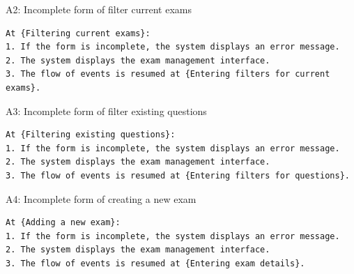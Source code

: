 \documentclass{article}
\begin{document}
\noindent A2: Incomplete form of filter current exams
\begin{verbatim}
At {Filtering current exams}:
1. If the form is incomplete, the system displays an error message.
2. The system displays the exam management interface.
3. The flow of events is resumed at {Entering filters for current exams}.
\end{verbatim}

\noindent A3: Incomplete form of filter existing questions
\begin{verbatim}
At {Filtering existing questions}:
1. If the form is incomplete, the system displays an error message.
2. The system displays the exam management interface.
3. The flow of events is resumed at {Entering filters for questions}.
\end{verbatim}

\noindent A4: Incomplete form of creating a new exam
\begin{verbatim}
At {Adding a new exam}:
1. If the form is incomplete, the system displays an error message.
2. The system displays the exam management interface.
3. The flow of events is resumed at {Entering exam details}.
\end{verbatim}
\end{document}
